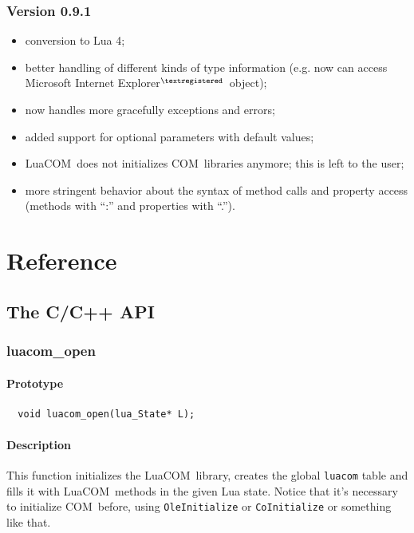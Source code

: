 \documentclass[11pt,a4paper,english]{report}
\newcommand{\ident}[1]{\mbox{\texttt{#1}}}
\newcommand{\techname}[1]{\mbox{#1}}
\newcommand{\com}{\techname{COM}}
\newcommand{\luacom}{\techname{LuaCOM}}
\newcommand{\registered}{$^{\textregistered}$}
\begin{document}
\subsection*{Version 0.9.1}
\begin{itemize}
\item conversion to Lua 4;
\item better handling of different kinds of type information (e.g. now
can access Microsoft Internet Explorer\registered\ object);
\item now handles more gracefully exceptions and errors;
\item added support for optional parameters with default values;
\item \luacom\ does not initializes \com\ libraries anymore; this is
left to the user;
\item more stringent behavior about the syntax of method calls and
property access (methods with ``:'' and properties with ``.'').
\end{itemize}





\chapter{Reference}
\label{chap:reference}


\section{The C/C++ API}

\subsection*{luacom\_open}
\subsubsection*{Prototype}

\begin{verbatim}
  void luacom_open(lua_State* L);
\end{verbatim}

\subsubsection*{Description}
This function initializes the \luacom\ library, creates the global
\verb+luacom+ table and fills it with \luacom\ methods in the given
Lua state. Notice that it's necessary to initialize \com\ before,
using \ident{OleInitialize} or \ident{CoInitialize} or something like
that.
\end{document}
